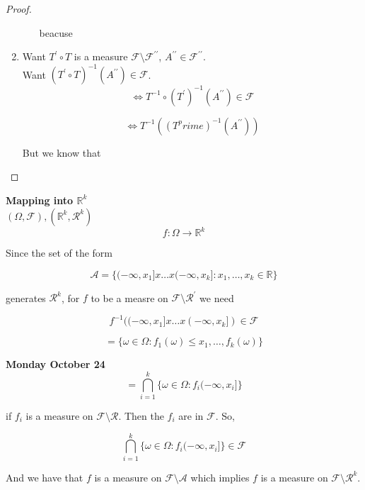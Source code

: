 \documentclass[11pt,fleqn]{book} %
\begin{document}
\begin{proof}
\begin{enumerate}
\begin{enumerate}
								beacuse  
					\end{enumerate}

		\item Want $T^\prime \circ T$ is a measure $\mathcal{F} \setminus \mathcal{F}^{\prime \prime}$, $A^{\prime\prime} \in \mathcal{F}^{\prime\prime}$.\\

		Want $(T^\prime \circ T)^{-1} (A^{\prime\prime} ) \in \mathcal{F}$.\\

				$$\Leftrightarrow T^{-1} \circ (T^\prime)^{-1} (A^{\prime\prime}) \in \mathcal{F}$$

				$$\Leftrightarrow T^{-1} ((T^prime)^{-1} (A^{\prime\prime}))$$

		But we know that 
	\end{enumerate}
	
\end{proof}


\textbf{Mapping into $\mathbb{R}^k$ }\\


$(\Omega, \mathcal{F}), (\mathbb{R}^k, \mathcal{R}^k)$\\

		$$f: \Omega \rightarrow \mathbb{R}^k $$

Since the set of the form 

		$$\mathcal{A} = \{(-\infty, x_1] x \dots x (-\infty, x_k]: x_1, \dots, x_k \in \mathbb{R} \} $$

generates $\mathcal{R}^k$, for $f$ to be a measre on $\mathcal{F} \setminus \mathcal{R}^\prime$ we need

		$$f^{-1}((-\infty, x_1] x \dots x (-\infty, x_k]) \in \mathcal{F} $$

		$$= \{\omega \in \Omega: f_1(\omega) \leq x_1, \dots, f_k(\omega)\} $$
		

\textbf{Monday October 24}\\

		$$ = \bigcap^k_{i=1} \{\omega \in \Omega: f_i(-\infty, x_i]\}$$

if $f_i$ is a measure on $\mathcal{F}\setminus \mathcal{R}$. Then the $f_i$ are in $\mathcal{F}$. So, 

		$$\bigcap^k_{i=1} \{\omega \in \Omega: f_i(-\infty, x_i]\} \in \mathcal{F}$$

And we have that $f$ is a measure on $\mathcal{F}\setminus \mathcal{A}$ which implies $f$ is a measure on $\mathcal{F}\setminus \mathcal{R}^k$.\\
\end{document}
